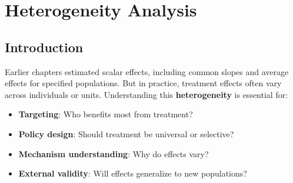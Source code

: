 
\chapter{Heterogeneity Analysis}
\label{ch:heterogeneity}

\section{Introduction}\label{sec:ch09_introduction}

Earlier chapters estimated scalar effects, including common slopes and average effects for specified populations. But in practice, treatment effects often vary across individuals or units. Understanding this \textbf{heterogeneity} is essential for:


\begin{itemize}
    \item \textbf{Targeting}: Who benefits most from treatment?
    \item \textbf{Policy design}: Should treatment be universal or selective?
    \item \textbf{Mechanism understanding}: Why do effects vary?
    \item \textbf{External validity}: Will effects generalize to new populations?
\end{itemize}


